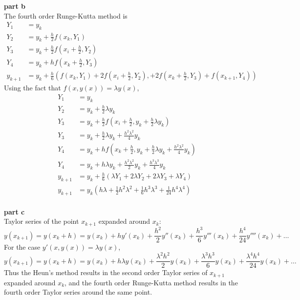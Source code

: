 \documentclass{article} %
\begin{document}
\textbf{part b} \\
The fourth order Runge-Kutta method is
\begin{align*}
Y_1 &= y_k \\
Y_2 &= y_k + \frac{h}{2}f(x_k, Y_1) \\
Y_3 &= y_k + \frac{h}{2}f(x_i + \frac{h}{2}, Y_2) \\
Y_4 &= y_k + hf(x_k+\frac{h}{2}, Y_3) \\
y_{k+1} &= y_k + \frac{h}{6}\left(f(x_k, Y_1) + 2f(x_i+\frac{h}{2}, Y_2), +2f(x_k+\frac{h}{2}, Y_3)+f(x_{k+1}, Y_4)\right)
\end{align*}
Using the fact that $f(x, y(x)) = \lambda y(x)$, 
\begin{align*}
Y_1 &= y_k \\
Y_2 &= y_k + \frac{h}{2}\lambda y_k \\
Y_3 &= y_k + \frac{h}{2}f(x_i + \frac{h}{2}, y_k + \frac{h}{2}\lambda y_k) \\
Y_3 &= y_k + \frac{h}{2}\lambda y_k + \frac{h^2 \lambda^2}{4} y_k \\
Y_4 &= y_k + hf(x_k+\frac{h}{2}, y_k + \frac{h}{2}\lambda y_k + \frac{h^2 \lambda^2}{4} y_k) \\
Y_4 &= y_k + h\lambda y_k + \frac{h^2 \lambda^2}{2}y_k + \frac{h^3 \lambda^3}{4}y_k \\
y_{k+1} &= y_k + \frac{h}{6}\left(\lambda Y_1 + 2\lambda Y_2 + 2\lambda Y_3 + \lambda Y_4\right) \\
y_{k+1} &= y_k \left(h\lambda + \frac{1}{2}h^2 \lambda^2 + \frac{1}{6}h^3 \lambda^3 + \frac{1}{24}h^4 \lambda^4 \right)
\end{align*}
\\

\textbf{part c} \\
Taylor series of the point $x_{k+1}$ expanded around $x_k$:
\begin{equation*}
y(x_{k+1}) = y(x_k+h) = y(x_k) + h y'(x_k) + \frac{h^2}{2}y''(x_k) + \frac{h^3}{6}y'''(x_k) +  \frac{h^4}{24}y''''(x_k) + \hdots
\end{equation*}
For the case $y'(x, y(x))=\lambda y(x)$, 
\begin{equation*}
y(x_{k+1}) = y(x_k+h) = y(x_k) + h \lambda y(x_k) + \frac{\lambda^2 h^2}{2}y(x_k) + \frac{\lambda^3 h^3}{6}y(x_k) +  \frac{\lambda^4 h^4}{24}y(x_k) + \hdots
\end{equation*}
Thus the Heun's method results in the second order Taylor series of $x_{k+1}$ expanded around $x_k$, and the fourth order Runge-Kutta method results in the fourth order Taylor series around the same point. \\
\end{document}
